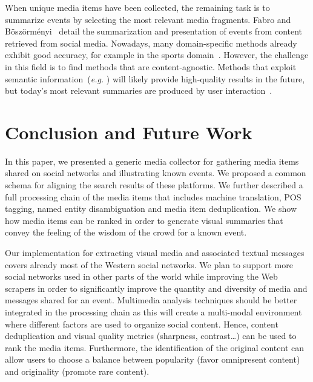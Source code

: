 When unique media items have been collected, the remaining task is to summarize events by selecting the most relevant media fragments. Fabro and B\"osz\"orm\'enyi~\cite{Fabro:MMM12} detail the summarization and presentation of events from content retrieved from social media. Nowadays, many domain-specific methods already exhibit good accuracy, for example in the sports domain~\cite{Li1,Li2}. However, the challenge in this field is to find methods that are content-agnostic. Methods that exploit semantic information~(\emph{e.g.} \cite{Chen}) will likely provide high-quality results in the future, but today's most relevant summaries are produced by user interaction~\cite{Olsen}.


\section{Conclusion and Future Work}                                        \label{sec:conclusion}
In this paper, we presented a generic media collector for gathering media items shared on social networks and illustrating known events. We proposed a common schema for aligning the search results of these platforms. We further described a full processing chain of the media items that includes machine translation, POS tagging, named entity disambiguation and media item deduplication. We show how media items can be ranked in order to generate visual summaries that convey the feeling of the wisdom of the crowd for a known event.

Our implementation for extracting visual media and associated textual messages covers already most of the Western social networks. We plan to support more social networks used in other parts of the world while improving the Web scrapers in order to significantly improve the quantity and diversity of media and messages shared for an event. Multimedia analysis techniques should be better integrated in the processing chain as this will create a multi-modal environment where different factors are used to organize social content. Hence, content deduplication and visual quality metrics (sharpness, contrast\ldots) can be used to rank the media items. Furthermore, the identification of the original content can allow users to choose a balance between popularity (favor omnipresent content) and originality (promote rare content).

